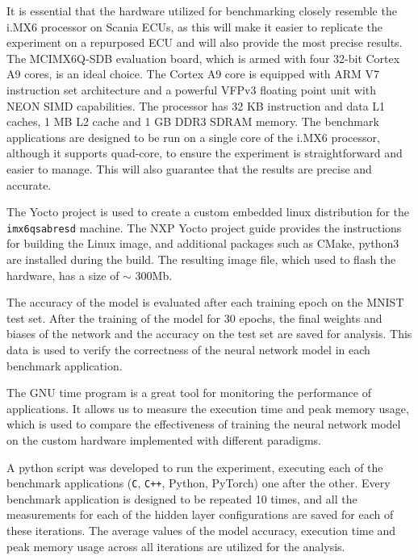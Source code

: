 It is essential that the hardware utilized for benchmarking closely resemble the i.MX6 processor on Scania ECUs, as this will make it easier to replicate the experiment on a repurposed ECU and will also provide the most precise results. The MCIMX6Q-SDB evaluation board, which is armed with four 32-bit Cortex A9 cores, is an ideal choice. The Cortex A9 core is equipped with ARM V7 instruction set architecture and a powerful VFPv3 floating point unit with NEON SIMD capabilities. The processor has 32 KB instruction and data L1 caches, 1 MB L2 cache and 1 GB DDR3 SDRAM memory. The benchmark applications are designed to be run on a single core of the i.MX6 processor, although it supports quad-core, to ensure the experiment is straightforward and easier to manage. This will also guarantee that the results are precise and accurate.

The Yocto project is used to create a custom embedded linux distribution for the \texttt{imx6qsabresd} machine. The NXP Yocto project guide \cite{nxp-yocto} provides the instructions for building the Linux image, and additional packages such as CMake, python3 are installed during the build. The resulting image file, which used to flash the hardware, has a size of $\sim$ 300Mb.

The accuracy of the model is evaluated after each training epoch on the MNIST test set. After the training of the model for 30 epochs, the final weights and biases of the network and the accuracy on the test set are saved for analysis. This data is used to verify the correctness of the neural network model in each benchmark application.

The GNU time program is a great tool for monitoring the performance of applications. It allows us to measure the execution time and peak memory usage, which is used to compare the effectiveness of training the neural network model on the custom hardware implemented with different paradigms.

A python script was developed to run the experiment, executing each of the benchmark applications (\texttt{C}, \texttt{C++}, Python, PyTorch) one after the other. Every benchmark application is designed to be repeated 10 times, and all the measurements for each of the hidden layer configurations are saved for each of these iterations. The average values of the model accuracy, execution time and peak memory usage across all iterations are utilized for the analysis.


